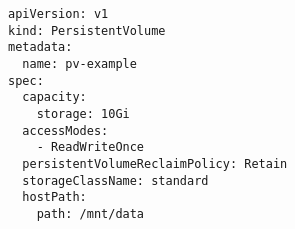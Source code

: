 \begin{verbatim}
apiVersion: v1
kind: PersistentVolume
metadata:
  name: pv-example
spec:
  capacity:
    storage: 10Gi
  accessModes:
    - ReadWriteOnce
  persistentVolumeReclaimPolicy: Retain
  storageClassName: standard
  hostPath:
    path: /mnt/data
\end{verbatim}